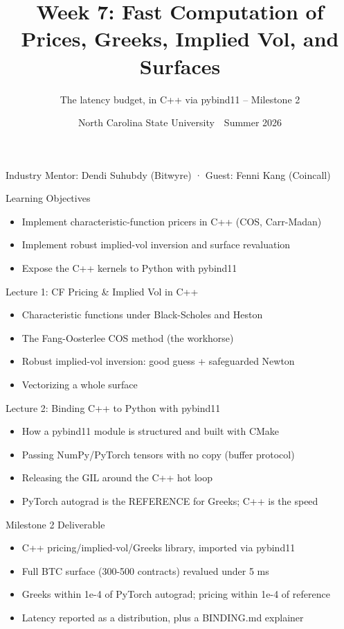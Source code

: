 \documentclass[aspectratio=169,11pt]{beamer}
\title{Week 7: Fast Computation of Prices, Greeks, Implied Vol, and Surfaces}
\subtitle{The latency budget, in C++ via pybind11 -- Milestone 2}
\date{North Carolina State University \,\textbar\, Summer 2026}
\begin{document}
\begin{frame}[plain]\titlepage
\begin{center}\tiny Industry Mentor: Dendi Suhubdy (Bitwyre)  ·  Guest: Fenni Kang (Coincall)\end{center}\end{frame}
\begin{frame}{Learning Objectives}
\begin{itemize}
  \item Implement characteristic-function pricers in C++ (COS, Carr-Madan)
  \item Implement robust implied-vol inversion and surface revaluation
  \item Expose the C++ kernels to Python with pybind11
\end{itemize}\end{frame}
\begin{frame}{Lecture 1: CF Pricing \& Implied Vol in C++}
\begin{itemize}
  \item Characteristic functions under Black-Scholes and Heston
  \item The Fang-Oosterlee COS method (the workhorse)
  \item Robust implied-vol inversion: good guess + safeguarded Newton
  \item Vectorizing a whole surface
\end{itemize}\end{frame}
\begin{frame}{Lecture 2: Binding C++ to Python with pybind11}
\begin{itemize}
  \item How a pybind11 module is structured and built with CMake
  \item Passing NumPy/PyTorch tensors with no copy (buffer protocol)
  \item Releasing the GIL around the C++ hot loop
  \item PyTorch autograd is the REFERENCE for Greeks; C++ is the speed
\end{itemize}\end{frame}
\begin{frame}{Milestone 2 Deliverable}
\begin{itemize}
  \item C++ pricing/implied-vol/Greeks library, imported via pybind11
  \item Full BTC surface (300-500 contracts) revalued under 5 ms
  \item Greeks within 1e-4 of PyTorch autograd; pricing within 1e-4 of reference
  \item Latency reported as a distribution, plus a BINDING.md explainer
\end{itemize}\end{frame}
\end{document}
